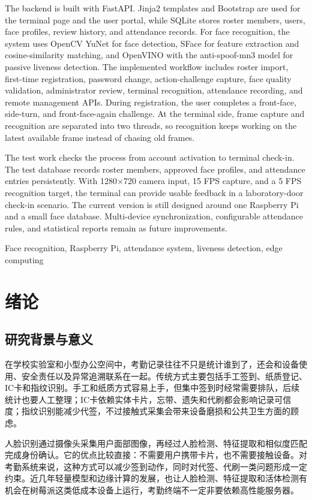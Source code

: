 \documentclass[UTF8]{heuthesis}
\begin{document}
The backend is built with FastAPI. Jinja2 templates and Bootstrap are used for the terminal page and the user portal, while SQLite stores roster members, users, face profiles, review history, and attendance records. For face recognition, the system uses OpenCV YuNet for face detection, SFace for feature extraction and cosine-similarity matching, and OpenVINO with the anti-spoof-mn3 model for passive liveness detection. The implemented workflow includes roster import, first-time registration, password change, action-challenge capture, face quality validation, administrator review, terminal recognition, attendance recording, and remote management APIs. During registration, the user completes a front-face, side-turn, and front-face-again challenge. At the terminal side, frame capture and recognition are separated into two threads, so recognition keeps working on the latest available frame instead of chasing old frames.

The test work checks the process from account activation to terminal check-in. The test database records roster members, approved face profiles, and attendance entries persistently. With 1280×720 camera input, 15 FPS capture, and a 5 FPS recognition target, the terminal can provide usable feedback in a laboratory-door check-in scenario. The current version is still designed around one Raspberry Pi and a small face database. Multi-device synchronization, configurable attendance rules, and statistical reports remain as future improvements.


\par{} Face recognition, Raspberry Pi, attendance system, liveness detection, edge computing
\clearpage
\tableofcontents
\clearpage
\mainmatter
\chapter{绪论}
\section{研究背景与意义}
在学校实验室和小型办公空间中，考勤记录往往不只是统计谁到了，还会和设备使用、安全责任以及异常追溯联系在一起。传统方式主要包括手工签到、纸质登记、IC卡和指纹识别。手工和纸质方式容易上手，但集中签到时经常需要排队，后续统计也要人工整理；IC卡依赖实体卡片，忘带、遗失和代刷都会影响记录可信度；指纹识别能减少代签，不过接触式采集会带来设备磨损和公共卫生方面的顾虑。

人脸识别通过摄像头采集用户面部图像，再经过人脸检测、特征提取和相似度匹配完成身份确认。它的优点比较直接：不需要用户携带卡片，也不需要接触设备。对考勤系统来说，这种方式可以减少签到动作，同时对代签、代刷一类问题形成一定约束。近几年轻量模型和边缘计算的发展，也让人脸检测、特征提取和活体检测有机会在树莓派这类低成本设备上运行，考勤终端不一定非要依赖高性能服务器。
\end{document}
